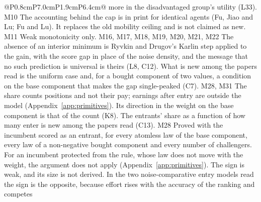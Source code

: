 \begin{longtable}{@{}P{0.8cm}P{7.0cm}P{1.9cm}P{6.4cm}@{}}
{  more in the disadvantaged group's utility (L33).}
  {M10}
  {The accounting behind the cap is in print for identical agents (Fu, Jiao
  and Lu; Fu and Lu). It replaces the old mobility ceiling and is not claimed
  as new.}
  {M11}
  {Weak monotonicity only.}
  {M16, M17, M18, M19, M20, M21, M22}
  {The absence of an interior minimum is Ryvkin and Drugov's Karlin step
  applied to the gain, with the score gap in place of the noise density, and
  the message that no such prediction is universal is theirs (L8, C12). What
  is new among the papers read is the uniform case and, for a bought component
  of two values, a condition on the base component that makes the gap
  single-peaked (C7).}
  {M28, M31}
  {The share counts positions and not their pay; earnings after entry are
  outside the model (Appendix~\ref{app:primitives}). Its direction in the
  weight on the base component is that of the count (K8). The entrants' share
  as a function of how many enter is new among the papers read (C13).}
  {M28}
  {Proved with the incumbent scored as an entrant, for every atomless law of
  the base component, every law of a non-negative bought component and every
  number of challengers. For an incumbent protected from the rule, whose law
  does not move with the weight, the argument does not apply
  (Appendix~\ref{app:primitives}). The sign is weak, and its size is not
  derived. In the two noise-comparative entry models read the sign is the
  opposite, because effort rises with the accuracy of the ranking and competes
}
\end{longtable}
